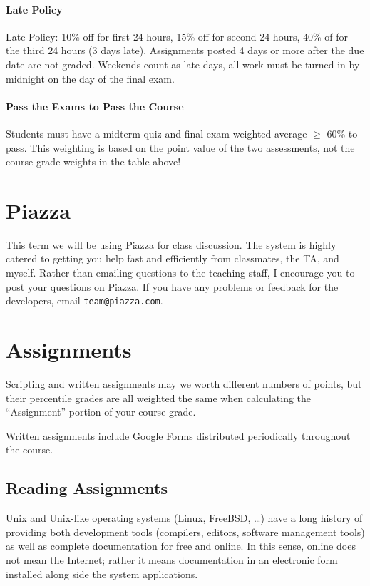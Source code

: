 \documentclass[12pt]{article}
\begin{document}
\paragraph{Late Policy}
Late Policy: 10\% off for first 24 hours, 15\% off for second 24 hours, 40\% of for the third 24 hours (3 days late). Assignments posted 4 days or more
after the due date are not graded. Weekends count as late days, all work must be turned in by midnight on the day of the final exam.

\paragraph{Pass the Exams to Pass the Course}
Students must have a midterm quiz and final exam weighted average $\geq$ 60\% to pass. This weighting is based on the point value of the two assessments,
not the course grade weights in the table above!
\section{Piazza}
This term we will be using Piazza for class discussion. The system is highly catered to getting you help fast and efficiently from classmates, the TA,
and myself. Rather than emailing questions to the teaching staff, I encourage you to post your questions on Piazza. If you have any problems or
feedback for the developers, email \texttt{team@piazza.com}.

\section{Assignments}
Scripting and written assignments may we worth different numbers of points, but their percentile grades are all weighted the same when calculating
the ``Assignment'' portion of your course grade.

Written assignments include Google Forms distributed periodically throughout the course.

\subsection{Reading Assignments}
Unix and Unix-like operating systems (Linux, FreeBSD, \dots) have a long history of providing both development tools (compilers, editors, software
management tools) as well as complete documentation for free and online. In this sense, online does not mean the Internet; rather it means
documentation in an electronic form installed along side the system applications.
\end{document}

